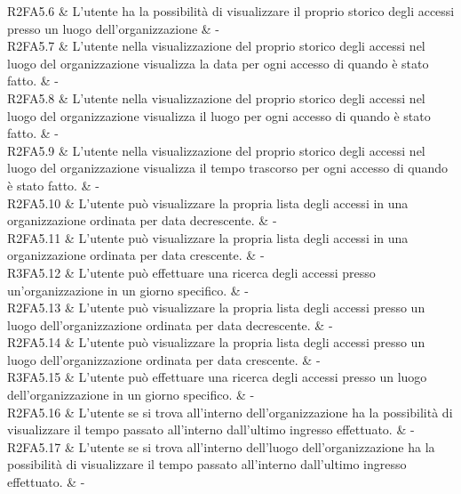 R2FA5.6 & L’utente ha la possibilità di visualizzare il proprio storico degli accessi presso un luogo dell’organizzazione & - \\

R2FA5.7 & L'utente nella visualizzazione del proprio storico degli accessi nel luogo del organizzazione visualizza la data per ogni accesso di quando è stato fatto.  & - \\

R2FA5.8 & L'utente nella visualizzazione del proprio storico degli accessi nel luogo del organizzazione visualizza il luogo per ogni accesso di quando è stato fatto.  & - \\

R2FA5.9 & L'utente nella visualizzazione del proprio storico degli accessi nel luogo del organizzazione visualizza il tempo trascorso per ogni accesso di quando è stato fatto.  & - \\

R2FA5.10 & L’utente può visualizzare la propria lista degli accessi in una organizzazione ordinata per data decrescente.  & - \\

R2FA5.11 & L’utente può visualizzare la propria lista degli accessi in una organizzazione ordinata per data crescente.  & - \\

R3FA5.12 & L’utente può effettuare una ricerca degli accessi presso un'organizzazione in un giorno specifico. & - \\

R2FA5.13 & L’utente può visualizzare la propria lista degli accessi presso un luogo dell’organizzazione  ordinata per data decrescente.  & - \\

R2FA5.14 & L’utente può visualizzare la propria lista degli accessi presso un luogo dell’organizzazione  ordinata per data crescente.  & - \\

R3FA5.15 & L’utente può effettuare una ricerca degli accessi presso un luogo dell’organizzazione  in un giorno specifico.  & - \\

R2FA5.16 & L’utente se si trova all’interno dell’organizzazione ha la possibilità di visualizzare il tempo passato all’interno dall'ultimo ingresso effettuato.  & - \\

R2FA5.17 & L’utente se si trova all’interno dell’luogo dell’organizzazione ha la possibilità di visualizzare il tempo passato all’interno dall'ultimo ingresso effettuato.  & - \\

